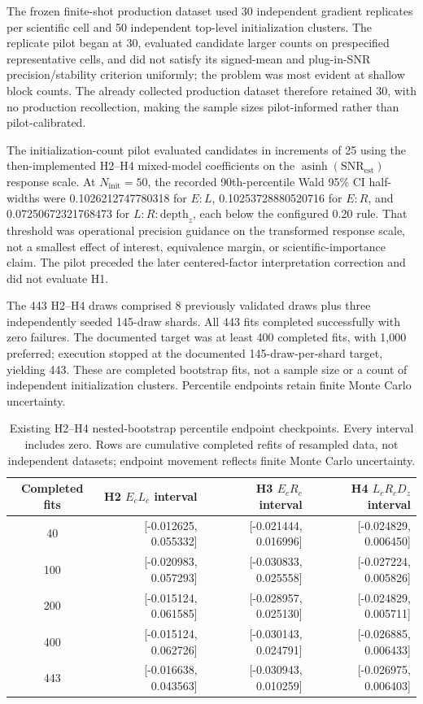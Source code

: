 \documentclass[pdflatex,sn-basic,Numbered]{sn-jnl}
\begin{document}
The frozen finite-shot production dataset used 30 independent gradient replicates per scientific cell and 50 independent top-level initialization clusters. The replicate pilot began at 30, evaluated candidate larger counts on prespecified representative cells, and did not satisfy its signed-mean and plug-in-SNR precision/stability criterion uniformly; the problem was most evident at shallow block counts. The already collected production dataset therefore retained 30, with no production recollection, making the sample sizes pilot-informed rather than pilot-calibrated.

The initialization-count pilot evaluated candidates in increments of 25 using the then-implemented H2--H4 mixed-model coefficients on the $\operatorname{asinh}(\mathrm{SNR}_{\mathrm{est}})$ response scale. At $N_{\mathrm{init}}=50$, the recorded 90th-percentile Wald 95\% CI half-widths were 0.1026212747780318 for $E{:}L$, 0.10253728880520716 for $E{:}R$, and 0.07250672321768473 for $L{:}R{:}\mathrm{depth}_z$, each below the configured 0.20 rule. That threshold was operational precision guidance on the transformed response scale, not a smallest effect of interest, equivalence margin, or scientific-importance claim. The pilot preceded the later centered-factor interpretation correction and did not evaluate H1.

The 443 H2--H4 draws comprised 8 previously validated draws plus three independently seeded 145-draw shards. All 443 fits completed successfully with zero failures. The documented target was at least 400 completed fits, with 1,000 preferred; execution stopped at the documented 145-draw-per-shard target, yielding 443. These are completed bootstrap fits, not a sample size or a count of independent initialization clusters. Percentile endpoints retain finite Monte Carlo uncertainty.

\begin{table}[t]\centering\small
\begin{tabular}{crrr}
\toprule
Completed fits & H2 $E_cL_c$ interval & H3 $E_cR_c$ interval & H4 $L_cR_cD_z$ interval \\
\midrule
40  & [-0.012625, 0.055332] & [-0.021444, 0.016996] & [-0.024829, 0.006450] \\
100 & [-0.020983, 0.057293] & [-0.030833, 0.025558] & [-0.027224, 0.005826] \\
200 & [-0.015124, 0.061585] & [-0.028957, 0.025130] & [-0.024829, 0.005711] \\
400 & [-0.015124, 0.062726] & [-0.030143, 0.024791] & [-0.026885, 0.006433] \\
443 & [-0.016638, 0.043563] & [-0.030943, 0.010259] & [-0.026975, 0.006403] \\
\bottomrule
\end{tabular}
\caption{Existing H2--H4 nested-bootstrap percentile endpoint checkpoints. Every interval includes zero. Rows are cumulative completed refits of resampled data, not independent datasets; endpoint movement reflects finite Monte Carlo uncertainty.}
\label{supp:tab:bootstrap-checkpoints}
\end{table}
\end{document}
